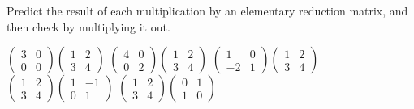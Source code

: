 \begin{exercises}
  \recommended \item
    Predict the result of each multiplication by an elementary
    reduction matrix, and then check by multiplying it out.
    \begin{exparts*}
      \partsitem \( \begin{pmatrix}
                 3  &0  \\
                 0  &0
               \end{pmatrix}
               \begin{pmatrix}
                 1  &2  \\
                 3  &4
               \end{pmatrix} \)
      \partsitem \( \begin{pmatrix}
                 4  &0  \\
                 0  &2
               \end{pmatrix}
               \begin{pmatrix}
                 1  &2  \\
                 3  &4
               \end{pmatrix} \)
      \partsitem \( \begin{pmatrix}
                 1  &0  \\
                -2  &1
               \end{pmatrix}
               \begin{pmatrix}
                 1  &2  \\
                 3  &4
               \end{pmatrix} \)
      \partsitem \( \begin{pmatrix}
                 1  &2  \\
                 3  &4
               \end{pmatrix}
               \begin{pmatrix}
                 1  &-1 \\
                 0  &1
               \end{pmatrix} \)
      \partsitem \( \begin{pmatrix}
                 1  &2  \\
                 3  &4
               \end{pmatrix}
               \begin{pmatrix}
                 0  &1  \\
                 1  &0
               \end{pmatrix} \)

\end{exparts*}
\end{exercises}
